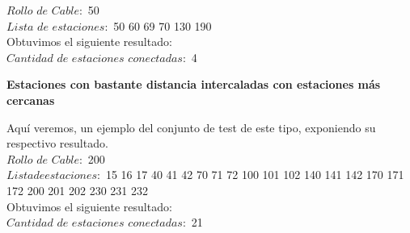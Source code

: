 \indent $Rollo$ $de$ $Cable:$ 50\\
$Lista$ $de$ $estaciones:$ 50 60 69 70 130 190\\

Obtuvimos el siguiente resultado:\\
  
  $Cantidad$ $de$ $estaciones$ $conectadas:$ 4

\begin{center}
 \textbf{Estaciones con bastante distancia intercaladas con estaciones m\'as cercanas}
\end{center}

Aqu\'i veremos, un ejemplo del conjunto de test de este tipo, exponiendo su respectivo resultado.\\

\indent $Rollo$ $de$ $Cable:$ 200\\
$Lista de estaciones:$ 15 16 17  40 41 42 70 71 72 100 101 102 140 141 142 170 171 172 200 201 202 230 231 232\\

Obtuvimos el siguiente resultado:\\ 
  
  $Cantidad$ $de$ $estaciones$ $conectadas:$ 21
